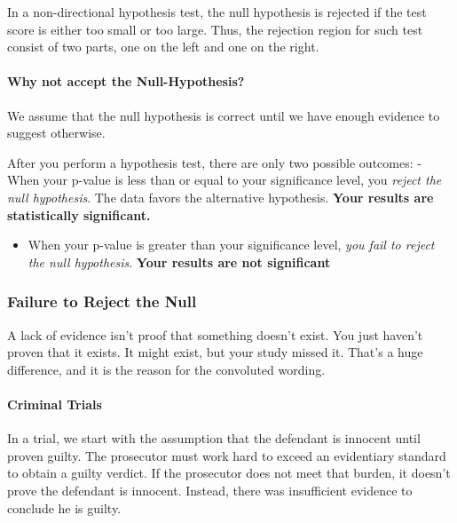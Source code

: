 \documentclass[11pt]{article}
\providecommand{\tightlist}{%
      \setlength{\itemsep}{0pt}\setlength{\parskip}{0pt}}
\begin{document}
In a non-directional hypothesis test, the null hypothesis is rejected if
the test score is either too small or too large. Thus, the rejection
region for such test consist of two parts, one on the left and one on
the right.

\hypertarget{why-not-accept-the-null-hypothesis}{%
\paragraph{Why not accept the Null-Hypothesis?}\label{why-not-accept-the-null-hypothesis}}

We assume that the null hypothesis is correct until we have enough
evidence to suggest otherwise.

After you perform a hypothesis test, there are only two possible
outcomes: - When your p-value is less than or equal to your significance
level, you \emph{reject the null hypothesis}. The data favors the
alternative hypothesis. \textbf{Your results are statistically
significant.}

\begin{itemize}
\tightlist
\item
  When your p-value is greater than your significance level, \emph{you
  fail to reject the null hypothesis}. \textbf{Your results are not
  significant}
\end{itemize}

\hypertarget{failure-to-reject-the-null}{%
\subsubsection{Failure to Reject the
Null}\label{failure-to-reject-the-null}}

A lack of evidence isn't proof that something doesn't exist. You just
haven't proven that it exists. It might exist, but your study missed it.
That's a huge difference, and it is the reason for the convoluted
wording.

\hypertarget{criminal-trials}{%
\paragraph{Criminal Trials}\label{criminal-trials}}

In a trial, we start with the assumption that the defendant is innocent
until proven guilty. The prosecutor must work hard to exceed an
evidentiary standard to obtain a guilty verdict. If the prosecutor does
not meet that burden, it doesn't prove the defendant is innocent.
Instead, there was insufficient evidence to conclude he is guilty.
\end{document}

